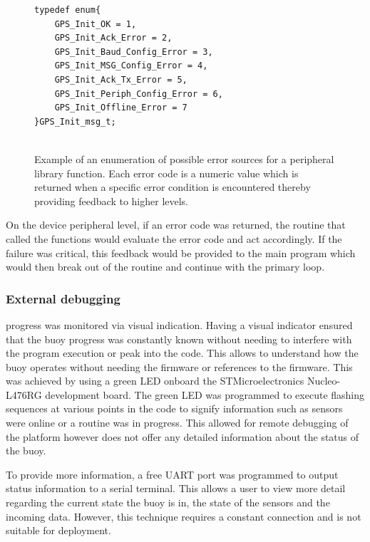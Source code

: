 \begin{figure}[H]
	
	\begin{lstlisting}
typedef enum{
	GPS_Init_OK = 1,
	GPS_Init_Ack_Error = 2,
	GPS_Init_Baud_Config_Error = 3,
	GPS_Init_MSG_Config_Error = 4,
	GPS_Init_Ack_Tx_Error = 5,
	GPS_Init_Periph_Config_Error = 6,
	GPS_Init_Offline_Error = 7
}GPS_Init_msg_t;
		
	\end{lstlisting}
	\caption{ Example of an enumeration of possible error sources for a peripheral library function. Each error code is a numeric value which is returned when a specific error condition is encountered thereby providing feedback to higher levels.}
	\label{fig:errorcode}
\end{figure}


 On the device peripheral level, if an error code was returned, the routine that called the functions would evaluate the error code and act accordingly. If the failure was critical, this feedback would be provided to the main program which would then break out of the routine and continue with the primary loop.
\subsubsection{External debugging}
progress was monitored via visual indication. Having a visual indicator ensured that the buoy progress was constantly known without needing to interfere with the program execution or peak into the code. This allows to understand how the buoy operates without needing the firmware or references to the firmware. This was achieved by using a green LED onboard the STMicroelectronics Nucleo-L476RG development board. The green LED was programmed to execute flashing sequences at various points in the code to signify information such as sensors were online or a routine was in progress. This allowed for remote debugging of the platform however does not offer any detailed information about the status of the buoy. \par

To provide more information, a free UART port was programmed to output status information to a serial terminal. This allows a user to view more detail regarding the current state the buoy is in, the state of the sensors and the incoming data. However, this technique requires a constant connection and is not suitable for deployment.
